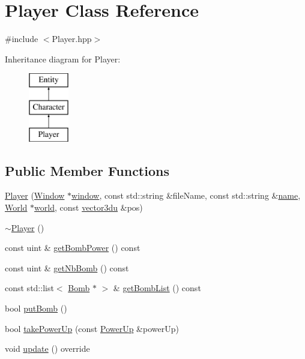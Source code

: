 \hypertarget{class_player}{}\section{Player Class Reference}
\label{class_player}


{\ttfamily \#include $<$Player.\+hpp$>$}

Inheritance diagram for Player\+:\begin{figure}[H]
\begin{center}
\leavevmode
\includegraphics[height=3.000000cm]{class_player}
\end{center}
\end{figure}
\subsection*{Public Member Functions}
\begin{DoxyCompactItemize}
\item 
\mbox{\hyperlink{class_player_a834edaa77749cec926a696368ad39cf0}{Player}} (\mbox{\hyperlink{class_window}{Window}} $\ast$\mbox{\hyperlink{class_entity_a1f2791b6a53a16e200a687f843cee7fb}{window}}, const std\+::string \&file\+Name, const std\+::string \&\mbox{\hyperlink{class_character_a6592c35167738421f3e04ca8808d37db}{name}}, \mbox{\hyperlink{class_world}{World}} $\ast$\mbox{\hyperlink{class_entity_a038b06c38fe6bb385f37c05a5647c0dc}{world}}, const \mbox{\hyperlink{_utility_8hpp_ac675fa2b6c79d0be47ae76e5d0ce38a8}{vector3du}} \&pos)
\item 
\mbox{\hyperlink{class_player_a749d2c00e1fe0f5c2746f7505a58c062}{$\sim$\+Player}} ()
\item 
const uint \& \mbox{\hyperlink{class_player_a76422a66b20f1499ea726245632dbbcb}{get\+Bomb\+Power}} () const
\item 
const uint \& \mbox{\hyperlink{class_player_a44887e7850f3c52e4ef95ff8e52c9439}{get\+Nb\+Bomb}} () const
\item 
const std\+::list$<$ \mbox{\hyperlink{class_bomb}{Bomb}} $\ast$ $>$ \& \mbox{\hyperlink{class_player_a30ce504fcf084e2e48f87d1b7a408281}{get\+Bomb\+List}} () const
\item 
bool \mbox{\hyperlink{class_player_a66e0c55125e2cfb68ceb50dc107ecdb1}{put\+Bomb}} ()
\item 
bool \mbox{\hyperlink{class_player_a447b343a103d4d78e298be0201e5fb45}{take\+Power\+Up}} (const \mbox{\hyperlink{class_power_up}{Power\+Up}} \&power\+Up)
\item 
void \mbox{\hyperlink{class_player_a6912bb6e48efb5845d59f0f4582827ef}{update}} () override
\end{DoxyCompactItemize}

